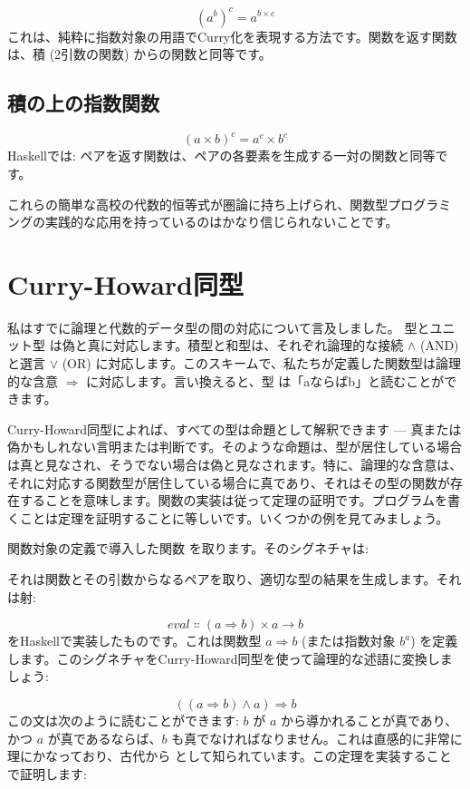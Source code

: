 \[(a^{b})^{c} = a^{b \times c}\]
これは、純粋に指数対象の用語でCurry化を表現する方法です。関数を返す関数は、積 (2引数の関数) からの関数と同等です。

\subsection{積の上の指数関数}

\[(a \times b)^{c} = a^{c} \times b^{c}\]
Haskellでは: ペアを返す関数は、ペアの各要素を生成する一対の関数と同等です。

これらの簡単な高校の代数的恒等式が圏論に持ち上げられ、関数型プログラミングの実践的な応用を持っているのはかなり信じられないことです。

\section{Curry-Howard同型}

私はすでに論理と代数的データ型の間の対応について言及しました。 型とユニット型 \code{()} は偽と真に対応します。積型と和型は、それぞれ論理的な接続 $\wedge$ (AND) と選言 $\vee$ (OR) に対応します。このスキームで、私たちが定義した関数型は論理的な含意 $\Rightarrow$ に対応します。言い換えると、型  は「aならばb」と読むことができます。

Curry-Howard同型によれば、すべての型は命題として解釈できます --- 真または偽かもしれない言明または判断です。そのような命題は、型が居住している場合は真と見なされ、そうでない場合は偽と見なされます。特に、論理的な含意は、それに対応する関数型が居住している場合に真であり、それはその型の関数が存在することを意味します。関数の実装は従って定理の証明です。プログラムを書くことは定理を証明することに等しいです。いくつかの例を見てみましょう。

関数対象の定義で導入した関数  を取ります。そのシグネチャは: 

それは関数とその引数からなるペアを取り、適切な型の結果を生成します。それは射: 

\[\mathit{eval} \Colon (a \Rightarrow b) \times a \to b\]
をHaskellで実装したものです。これは関数型 $a \Rightarrow b$ (または指数対象 $b^a$) を定義します。このシグネチャをCurry-Howard同型を使って論理的な述語に変換しましょう: 

\[((a \Rightarrow b) \wedge a) \Rightarrow b\]
この文は次のように読むことができます: $b$ が $a$ から導かれることが真であり、かつ $a$ が真であるならば、$b$ も真でなければなりません。これは直感的に非常に理にかなっており、古代から  として知られています。この定理を実装することで証明します: 

